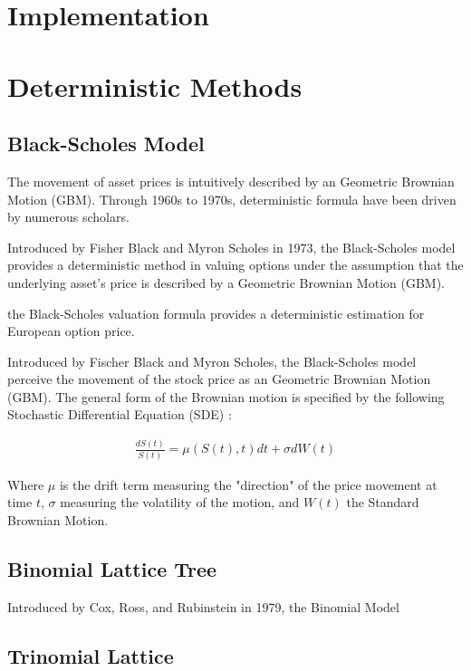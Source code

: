 \section{Implementation} \label{sec:Implementation}

\section{Deterministic Methods}

\subsection{Black-Scholes Model}
The movement of asset prices is intuitively described by an Geometric Brownian Motion (GBM). Through 1960s to 1970s, deterministic formula have been driven by numerous scholars.

Introduced by Fisher Black and Myron Scholes in 1973, the Black-Scholes model provides a deterministic method in valuing options under the assumption that the underlying asset's price is described by a Geometric Brownian Motion (GBM).


the Black-Scholes valuation formula provides a deterministic estimation for European option price.


Introduced by Fischer Black and Myron Scholes, the Black-Scholes model perceive the movement of the stock price as an Geometric Brownian Motion (GBM). The general form of the Brownian motion is specified by the following Stochastic Differential Equation (SDE) \cite{Glasserman2003}:

\begin{align}
\frac{dS(t)}{S(t)} = \mu (S(t), t)dt + \sigma dW(t)
\end{align}

Where $\mu$ is the drift term measuring the "direction" of the price movement at time $t$, $\sigma$ measuring the volatility of the motion, and $W(t)$ the Standard Brownian Motion.



\subsection{Binomial Lattice Tree}

Introduced by Cox, Ross, and Rubinstein in 1979, the Binomial Model


\subsection{Trinomial Lattice}
    
